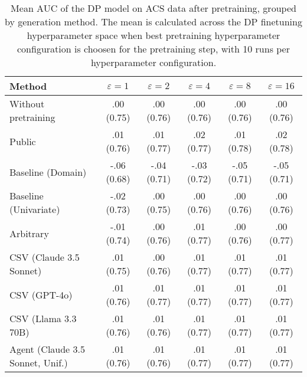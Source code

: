 \begin{table}[h!]
    \centering
    \caption{Mean AUC of the DP model on ACS data after pretraining, grouped by generation method. The mean is calculated across the DP finetuning hyperparameter space when best pretraining hyperparameter configuration is choosen for the pretraining step, with 10 runs per hyperparameter configuration.}
    \label{tab:epsilon_comparison}
    \begin{tabular}{lccccc}
    \toprule
    Method & $\varepsilon=1$ & $\varepsilon=2$ & $\varepsilon=4$ & $\varepsilon=8$ & $\varepsilon=16$ \\
    \midrule
    Without pretraining & .00 {\small (0.75)} & .00 {\small (0.76)} & .00 {\small (0.76)} & .00 {\small (0.76)} & .00 {\small (0.76)} \\
    \arrayrulecolor{black!50!}\midrule
    Public & \cellcolor{silver!30}.01 {\small (0.76)} & \cellcolor{gold!30}.01 {\small (0.77)} & \cellcolor{gold!30}.02 {\small (0.77)} & \cellcolor{gold!30}.01 {\small (0.78)} & \cellcolor{gold!30}.02 {\small (0.78)} \\
    \arrayrulecolor{black!50!}\midrule
    Baseline (Domain) & -.06 {\small (0.68)} & -.04 {\small (0.71)} & -.03 {\small (0.72)} & -.05 {\small (0.71)} & -.05 {\small (0.71)} \\
    Baseline (Univariate) & -.02 {\small (0.73)} & .00 {\small (0.75)} & .00 {\small (0.76)} & .00 {\small (0.76)} & .00 {\small (0.76)} \\
    \arrayrulecolor{black!50!}\midrule
    Arbitrary & -.01 {\small (0.74)} & .00 {\small (0.76)} & .01 {\small (0.77)} & .00 {\small (0.76)} & .00 {\small (0.77)} \\
    \arrayrulecolor{black!50!}\midrule
    CSV (Claude 3.5 Sonnet) & .01 {\small (0.75)} & .00 {\small (0.76)} & .01 {\small (0.77)} & .01 {\small (0.77)} & .01 {\small (0.77)} \\
    CSV (GPT-4o) & \cellcolor{silver!30}.01 {\small (0.76)} & \cellcolor{bronze!30}.01 {\small (0.77)} & \cellcolor{silver!30}.01 {\small (0.77)} & \cellcolor{bronze!30}.01 {\small (0.77)} & \cellcolor{bronze!30}.01 {\small (0.77)} \\
    CSV (Llama 3.3 70B) & \cellcolor{bronze!30}.01 {\small (0.76)} & .01 {\small (0.76)} & .01 {\small (0.77)} & \cellcolor{silver!30}.01 {\small (0.77)} & \cellcolor{bronze!30}.01 {\small (0.77)} \\
    \arrayrulecolor{black!50!}\midrule
    Agent (Claude 3.5 Sonnet, Unif.) & .01 {\small (0.76)} & .01 {\small (0.76)} & .01 {\small (0.77)} & .01 {\small (0.77)} & \cellcolor{silver!30}.01 {\small (0.77)} \\

\end{tabular}
\end{table}
